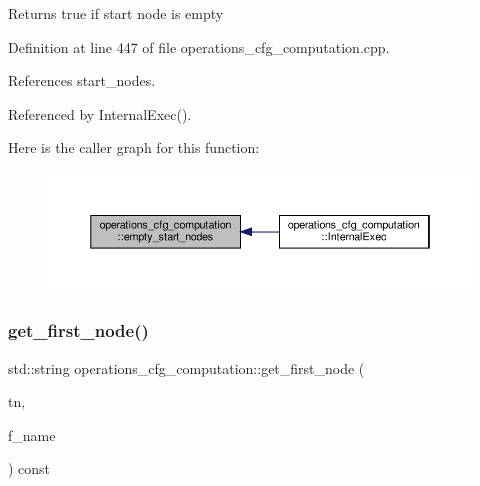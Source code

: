 \begin{DoxyReturn}{Returns}
true if start node is empty 
\end{DoxyReturn}


Definition at line 447 of file operations\+\_\+cfg\+\_\+computation.\+cpp.



References start\+\_\+nodes.



Referenced by Internal\+Exec().

Here is the caller graph for this function\+:
\nopagebreak
\begin{figure}[H]
\begin{center}
\leavevmode
\includegraphics[width=350pt]{d0/d11/classoperations__cfg__computation_a3565d9d33d44fce47a2fde3d39392f4b_icgraph}
\end{center}
\end{figure}
\mbox{\label{classoperations__cfg__computation_a552a18ba450de75c9651cc9eda82f3ac}} 
\subsubsection{\texorpdfstring{get\+\_\+first\+\_\+node()}{get\_first\_node()}}
{\footnotesize\ttfamily std\+::string operations\+\_\+cfg\+\_\+computation\+::get\+\_\+first\+\_\+node (\begin{DoxyParamCaption}\item[{const \hyperlink{tree__node_8hpp_a6ee377554d1c4871ad66a337eaa67fd5}{tree\+\_\+node\+Ref} \&}]{tn,  }\item[{const std\+::string \&}]{f\+\_\+name }\end{DoxyParamCaption}) const\hspace{0.3cm}{\ttfamily [private]}}



